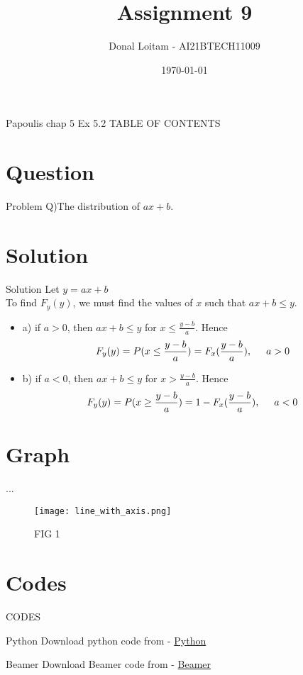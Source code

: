 \documentclass{beamer}
\title{Assignment 9}
\author{Donal Loitam - AI21BTECH11009}
\date{\today}
\begin{document}
\begin{frame}
    \titlepage 
\end{frame}

\logo{}


\begin{frame}{Papoulis chap 5 Ex 5.2}
TABLE OF CONTENTS
    \tableofcontents
\end{frame}


\section{Question}
\begin{frame}{Problem}
Q)The distribution of $ax+b$. 
\end{frame}

\section{Solution}
\begin{frame}{Solution}
    Let $y = ax+b$ \\
    To find $F_y(y)$, we must find the values of $x$ such that $ax+b \le y$.
    \begin{itemize}
        \item a) if $a > 0$, then $ax+b \le y$ for $x \le \frac{y-b}{a}$. Hence 
        \begin{align}
            F_y(y) = P(x \le \frac{y-b}{a})= F_x(\frac{y-b}{a}) , \hspace{5mm}  a>0
        \end{align} 

        \item b) if $a < 0$, then $ax+b \le y$ for $x > \frac{y-b}{a}$. Hence 
        \begin{align}
            F_y(y) = P(x \ge \frac{y-b}{a})= 1-F_x(\frac{y-b}{a}) , \hspace{5mm}  a<0
        \end{align} 
        

        
    \end{itemize}

\end{frame}

\section{Graph}
\begin{frame}{...}
    \begin{figure}[!ht]
		\centering
		\texttt{[image: line\_with\_axis.png]}
		\caption{FIG 1}
		\label{fig1}
	\end{figure}
\end{frame}

\section{Codes}
\begin{frame}{CODES}
    \begin{block}{Python}
         Download python code from - \href{...}{Python}
    \end{block}

 \begin{block}{Beamer}
         Download Beamer code from - \href{...}{Beamer}
    \end{block}
\end{frame} 
\end{document}
